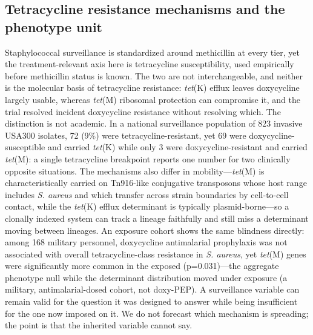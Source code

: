 \documentclass[12pt,a4paper]{article}
\begin{document}
\subsection*{Tetracycline resistance mechanisms and the phenotype unit}
Staphylococcal surveillance is standardized around methicillin at every tier,
yet the treatment-relevant axis here is tetracycline susceptibility, used
empirically before methicillin status is known. The two are not
interchangeable, and neither is the molecular basis of tetracycline resistance:
\emph{tet}(K) efflux leaves doxycycline largely usable, whereas \emph{tet}(M)
ribosomal protection can compromise it, and the trial resolved incident
doxycycline resistance without resolving which.\cite{liu2011,grossman2016} The
distinction is not academic. In a national surveillance population of 823 invasive
USA300 isolates, 72 (9\%) were tetracycline-resistant, yet 69 were
doxycycline-susceptible and carried \emph{tet}(K) while only 3 were
doxycycline-resistant and carried \emph{tet}(M)\cite{mcdougal2010}: a single
tetracycline breakpoint reports one number for two clinically opposite
situations. The mechanisms also differ in mobility---\emph{tet}(M) is
characteristically carried on Tn916-like conjugative transposons whose host range
includes \emph{S. aureus} and which transfer across strain boundaries by
cell-to-cell contact,\cite{roberts2011} while the \emph{tet}(K) efflux determinant
is typically plasmid-borne\cite{han2007,mcdougal2010}---so a clonally indexed
system can track a lineage faithfully and still miss a determinant moving between
lineages. An exposure cohort shows the same blindness directly: among 168
military personnel, doxycycline antimalarial prophylaxis was not associated with
overall tetracycline-class resistance in \emph{S. aureus}, yet \emph{tet}(M) genes
were significantly more common in the exposed (p=0.031)\cite{mende2016}---the
aggregate phenotype null while the determinant distribution moved under exposure
(a military, antimalarial-dosed cohort, not doxy-PEP). A surveillance variable can
remain valid for the question it was designed to answer while being insufficient
for the one now imposed on it. We do not forecast which
mechanism is spreading; the point is that the inherited variable cannot say.
\end{document}

